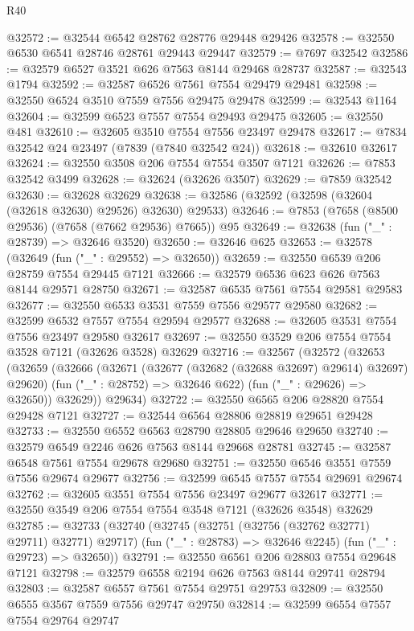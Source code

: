 \begin{lexlean}{R40}
\begin{coremodule}
@32572 := @32544 @6542 @28762 @28776 @29448 @29426
@32578 := @32550 @6530 @6541 @28746 @28761 @29443 @29447
@32579 := @7697 @32542
@32586 := @32579 @6527 @3521 @626 @7563 @8144 @29468 @28737
@32587 := @32543 @1794
@32592 := @32587 @6526 @7561 @7554 @29479 @29481
@32598 := @32550 @6524 @3510 @7559 @7556 @29475 @29478
@32599 := @32543 @1164
@32604 := @32599 @6523 @7557 @7554 @29493 @29475
@32605 := @32550 @481
@32610 := @32605 @3510 @7554 @7556 @23497 @29478
@32617 := @7834 @32542 @24 @23497 (@7839 (@7840 @32542 @24))
@32618 := @32610 @32617
@32624 := @32550 @3508 @206 @7554 @7554 @3507 @7121
@32626 := @7853 @32542 @3499
@32628 := @32624 (@32626 @3507)
@32629 := @7859 @32542
@32630 := @32628 @32629
@32638 := @32586 (@32592 (@32598 (@32604 (@32618 @32630) @29526) @32630) @29533)
@32646 := @7853 (@7658 (@8500 @29536) (@7658 (@7662 @29536) @7665)) @95
@32649 := @32638 (fun ("_" : @28739) => @32646 @3520)
@32650 := @32646 @625
@32653 := @32578 (@32649 (fun ("_" : @29552) => @32650))
@32659 := @32550 @6539 @206 @28759 @7554 @29445 @7121
@32666 := @32579 @6536 @623 @626 @7563 @8144 @29571 @28750
@32671 := @32587 @6535 @7561 @7554 @29581 @29583
@32677 := @32550 @6533 @3531 @7559 @7556 @29577 @29580
@32682 := @32599 @6532 @7557 @7554 @29594 @29577
@32688 := @32605 @3531 @7554 @7556 @23497 @29580 @32617
@32697 := @32550 @3529 @206 @7554 @7554 @3528 @7121 (@32626 @3528) @32629
@32716 := @32567
    (@32572
      (@32653
        (@32659
          (@32666
            (@32671 (@32677 (@32682 (@32688 @32697) @29614) @32697) @29620)
            (fun ("_" : @28752) => @32646 @622)
            (fun ("_" : @29626) => @32650))
          @32629))
      @29634)
@32722 := @32550 @6565 @206 @28820 @7554 @29428 @7121
@32727 := @32544 @6564 @28806 @28819 @29651 @29428
@32733 := @32550 @6552 @6563 @28790 @28805 @29646 @29650
@32740 := @32579 @6549 @2246 @626 @7563 @8144 @29668 @28781
@32745 := @32587 @6548 @7561 @7554 @29678 @29680
@32751 := @32550 @6546 @3551 @7559 @7556 @29674 @29677
@32756 := @32599 @6545 @7557 @7554 @29691 @29674
@32762 := @32605 @3551 @7554 @7556 @23497 @29677 @32617
@32771 := @32550 @3549 @206 @7554 @7554 @3548 @7121 (@32626 @3548) @32629
@32785 := @32733
    (@32740
      (@32745 (@32751 (@32756 (@32762 @32771) @29711) @32771) @29717)
      (fun ("_" : @28783) => @32646 @2245)
      (fun ("_" : @29723) => @32650))
@32791 := @32550 @6561 @206 @28803 @7554 @29648 @7121
@32798 := @32579 @6558 @2194 @626 @7563 @8144 @29741 @28794
@32803 := @32587 @6557 @7561 @7554 @29751 @29753
@32809 := @32550 @6555 @3567 @7559 @7556 @29747 @29750
@32814 := @32599 @6554 @7557 @7554 @29764 @29747

\end{coremodule}
\end{lexlean}
